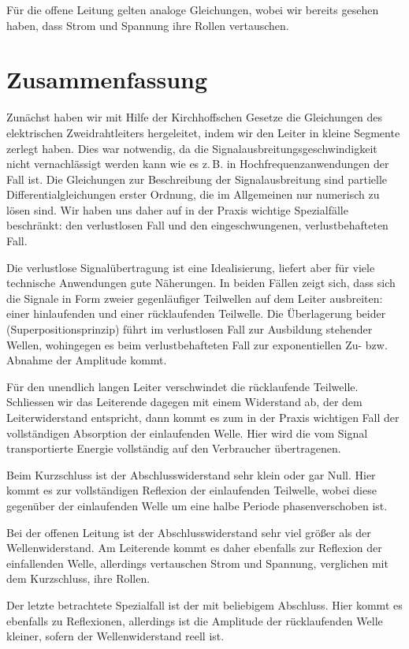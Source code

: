 \documentclass[paper=a4, parskip=half-, ngerman, fontsize=11pt]{scrreprt}
\begin{document}
Für die offene Leitung gelten analoge Gleichungen, wobei wir bereits gesehen haben, dass Strom und Spannung ihre Rollen
vertauschen.


\chapter{Zusammenfassung}
Zunächst haben wir mit Hilfe der Kirchhoffschen Gesetze die Gleichungen des elektrischen Zweidrahtleiters hergeleitet,
indem wir den Leiter in kleine Segmente zerlegt haben. Dies war notwendig, da die Signalausbreitungsgeschwindigkeit
nicht vernachlässigt werden kann wie es z.\,B. in Hochfrequenzanwendungen der Fall ist. Die Gleichungen zur
Beschreibung der Signalausbreitung sind partielle Differentialgleichungen erster Ordnung, die im Allgemeinen nur
numerisch zu lösen sind. Wir haben uns daher auf in der Praxis wichtige Spezialfälle beschränkt: den verlustlosen Fall
und den eingeschwungenen, verlustbehafteten Fall.

Die verlustlose Signalübertragung ist eine Idealisierung, liefert aber für viele technische Anwendungen gute
Näherungen. In beiden Fällen zeigt sich, dass sich die Signale in Form zweier gegenläufiger Teilwellen auf
dem Leiter ausbreiten: einer hinlaufenden und einer rücklaufenden Teilwelle. Die Überlagerung beider
(Superpositionsprinzip) führt im verlustlosen Fall zur Ausbildung stehender Wellen, wohingegen es beim
verlustbehafteten Fall zur exponentiellen Zu- bzw. Abnahme der Amplitude kommt.

Für den unendlich langen Leiter verschwindet die rücklaufende Teilwelle. Schliessen wir das Leiterende dagegen mit
einem Widerstand ab, der dem Leiterwiderstand entspricht, dann kommt es zum in der Praxis wichtigen Fall der
vollständigen Absorption der einlaufenden Welle. Hier wird die vom Signal transportierte Energie vollständig auf den
Verbraucher übertragenen.

Beim Kurzschluss ist der Abschlusswiderstand sehr klein oder gar Null. Hier kommt es zur vollständigen Reflexion der
einlaufenden Teilwelle, wobei diese gegenüber der einlaufenden Welle um eine halbe Periode phasenverschoben ist.

Bei der offenen Leitung ist der Abschlusswiderstand sehr viel größer als der Wellenwiderstand. Am Leiterende kommt es
daher ebenfalls zur Reflexion der einfallenden Welle, allerdings vertauschen Strom und Spannung, verglichen mit dem
Kurzschluss, ihre Rollen.

Der letzte betrachtete Spezialfall ist der mit beliebigem Abschluss. Hier kommt es ebenfalls zu Reflexionen, allerdings
ist die Amplitude der rücklaufenden Welle kleiner, sofern der Wellenwiderstand reell ist.
\end{document}
